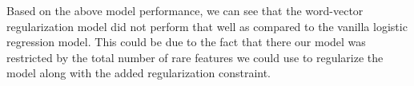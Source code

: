 Based on the above model performance, we can see that the word-vector regularization model did not perform that well as compared to the vanilla logistic regression model. This could be due to the fact that there our model was restricted by the total number of rare features we could use to regularize the model along with the added regularization constraint.

\fi